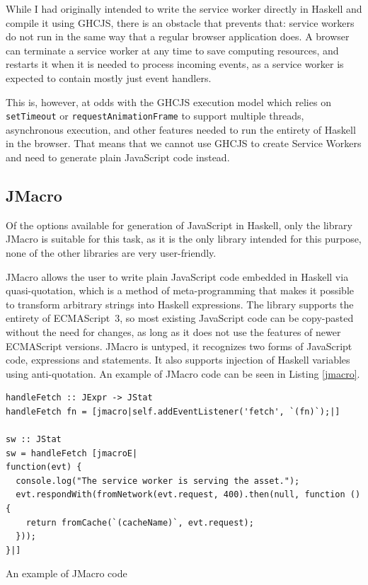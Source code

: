 \documentclass[english,zadani,odsaz]{fitthesis}
\begin{document}
While I had originally intended to write the service worker directly in Haskell
and compile it using GHCJS, there is an obstacle that prevents that: service
workers do not run in the same way that a regular browser application does. A
browser can terminate a service worker at any time to save computing resources,
and restarts it when it is needed to process incoming events, as a service
worker is expected to contain mostly just event handlers.

This is, however, at odds with the GHCJS execution model which relies on
\texttt{setTimeout} or \texttt{requestAnimationFrame} to support multiple threads, asynchronous
execution, and other features needed to run the entirety of Haskell in the
browser. That means that we cannot use GHCJS to create Service Workers and need
to generate plain JavaScript code instead.

\subsection{JMacro}
\label{sec:org74bd2ce}
Of the options available for generation of JavaScript in Haskell, only the
library JMacro is suitable for this task, as it is the only library intended for
this purpose, none of the other libraries are very user-friendly.

JMacro allows the user to write plain JavaScript code embedded in Haskell via
quasi-quotation, which is a method of meta-programming that makes it possible to
transform arbitrary strings into Haskell expressions. The library supports the
entirety of ECMAScript~3, so most existing JavaScript code can be
copy-pasted without the need for changes, as long as it does not use the
features of newer ECMAScript versions. JMacro is untyped, it recognizes two
forms of JavaScript code, expressions and statements. It also supports injection
of Haskell variables using anti-quotation. An example of JMacro code can be seen
in Listing \ref{jmacro}.

\begin{listing}[tb]
\begin{verbatim}
handleFetch :: JExpr -> JStat
handleFetch fn = [jmacro|self.addEventListener('fetch', `(fn)`);|]

sw :: JStat
sw = handleFetch [jmacroE|
function(evt) {
  console.log("The service worker is serving the asset.");
  evt.respondWith(fromNetwork(evt.request, 400).then(null, function () {
    return fromCache(`(cacheName)`, evt.request);
  }));
}|]
\end{verbatim}
\caption{An example of JMacro code \label{jmacro}}
\end{listing}
\end{document}
